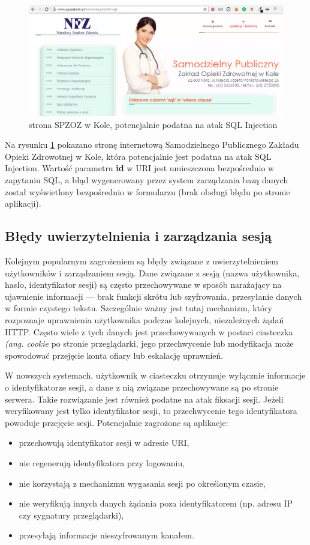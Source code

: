 \documentclass[11pt,a4paper,polish,thesis,oneside]{dcsbook}
\begin{document}
\begin{figure}[h]
\centering
\includegraphics[scale=0.4]{szpital}

\caption{strona SPZOZ w Kole, potencjalnie podatna na atak SQL Injection}
\label{fig:szpital}
\end{figure}

Na rysunku \ref{fig:szpital} pokazano stronę internetową Samodzielnego Publicznego Zakładu Opieki Zdrowotnej w Kole, która potencjalnie jest podatna na atak SQL Injection. Wartość parametru \textbf{id} w URI jest umieszczona bezpośrednio w zapytaniu SQL, a błąd wygenerowany przez system zarządzania bazą danych został wyświetlony bezpośrednio w formularzu (brak obsługi błędu po stronie aplikacji).

\subsection{Błędy uwierzytelnienia i zarządzania sesją}
Kolejnym popularnym zagrożeniem są błędy związane z uwierzytelnieniem użytkowników i zarządzaniem sesją. Dane związane z sesją (nazwa użytkownika, hasło, identyfikator sesji) są często przechowywane w sposób narażający na ujawnienie informacji --- brak funkcji skrótu lub szyfrowania, przesyłanie danych w formie czystego tekstu. Szczególnie ważny jest tutaj mechanizm, który rozpoznaje uprawnienia użytkownika podczas kolejnych, niezależnych żądań HTTP. Często wiele z tych danych jest przechowywanych w postaci ciasteczka \textit{(ang. cookie} po stronie przeglądarki, jego przechwycenie lub modyfikacja może spowodować przejęcie konta ofiary lub eskalację uprawnień.

W nowszych systemach, użytkownik w ciasteczku otrzymuje wyłącznie informacje o identyfikatorze sesji, a dane z nią związane przechowywane są po stronie serwera. Takie rozwiązanie jest również podatne na atak fiksacji sesji. Jeżeli weryfikowany jest tylko identyfikator sesji, to przechwycenie tego identyfikatora powoduje przejęcie sesji. Potencjalnie zagrożone są aplikacje:
\begin{itemize}
\item przechowują identyfikator sesji w adresie URI,
\item nie regenerują identyfikatora przy logowaniu,
\item nie korzystają z mechanizmu wygasania sesji po określonym czasie,
\item nie weryfikują innych danych żądania poza identyfikatorem (np. adresu IP czy sygnatury przeglądarki),
\item przesyłają informacje nieszyfrowanym kanałem.
\end{itemize}
\end{document}
